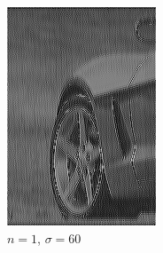 \documentclass[
	12pt, %
]{style/fphw}
\begin{document}
\begin{figure}[H]
\begin{subfigure}[b]{.22\textwidth}
             \includegraphics[width=\textwidth]{plots2/Q5_3_1_60.png}
             \caption{$n=1$, $\sigma=60$}
             \label{Q5_3_1_60.tif}
         \end{subfigure}
         \hfill
         \begin{subfigure}[b]{.22\textwidth}
             \centering

\end{subfigure}
\end{figure}
\end{document}
